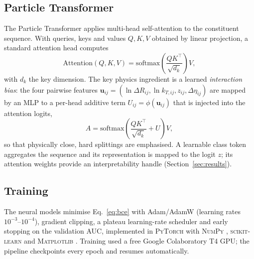\documentclass[preprint,12pt]{elsarticle}
\begin{document}
\subsection{Particle Transformer}
\label{sec:part}
The Particle Transformer \citep{qu2022particletransformer} applies multi-head
self-attention \citep{vaswani2017attention} to the constituent sequence. With
queries, keys and values $Q,K,V$ obtained by linear projection, a standard
attention head computes
\begin{equation}
\mathrm{Attention}(Q,K,V) =
\mathrm{softmax}\!\left(\frac{QK^{\top}}{\sqrt{d_k}}\right)V,
\label{eq:attention}
\end{equation}
with $d_k$ the key dimension. The key physics ingredient is a learned
\emph{interaction bias}: the four pairwise features
$\mathbf{u}_{ij}=(\ln\Delta R_{ij},\ln k_{T,ij},z_{ij},\Delta\eta_{ij})$ are
mapped by an MLP to a per-head additive term $U_{ij}=\phi(\mathbf{u}_{ij})$
that is injected into the attention logits,
\begin{equation}
A = \mathrm{softmax}\!\left(\frac{QK^{\top}}{\sqrt{d_k}} + U\right)V,
\label{eq:part-attention}
\end{equation}
so that physically close, hard splittings are emphasised. A learnable class
token aggregates the sequence and its representation is mapped to the logit
$z$; its attention weights provide an interpretability handle
(Section~\ref{sec:results}).

\subsection{Training}
\label{sec:training}
The neural models minimise Eq.~\eqref{eq:bce} with Adam/AdamW
\citep{kingma2014adam,loshchilov2019adamw} (learning rates $10^{-3}$--$10^{-4}$),
gradient clipping, a plateau learning-rate scheduler and early stopping on the
validation AUC, implemented in \textsc{PyTorch} \citep{paszke2019pytorch} with
\textsc{NumPy} \citep{harris2020numpy}, \textsc{scikit-learn}
\citep{pedregosa2011scikit} and \textsc{Matplotlib}
\citep{hunter2007matplotlib}. Training used a free Google Colaboratory T4 GPU;
the pipeline checkpoints every epoch and resumes automatically.
\end{document}
